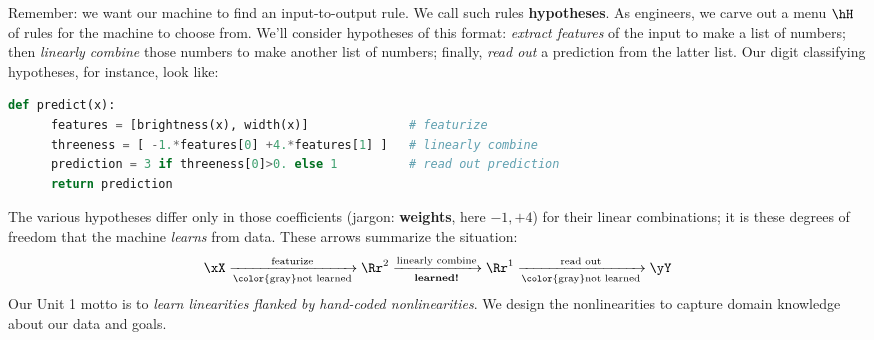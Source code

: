 

  Remember: we want our machine to find an input-to-output rule.  We call
  such rules \textbf{hypotheses}.  As engineers, we carve out a menu $\hH$ of
  rules for the machine to choose from.
  We'll consider
  hypotheses of this format:
  \emph{extract features} of the input to make a list of numbers; then
  \emph{linearly combine} those numbers to make another list of numbers;
  finally,
  \emph{read out} a prediction %
  from the latter list.
  Our digit classifying hypotheses, for instance, look like:
  \begin{lstlisting}[language=Python, basicstyle=\footnotesize\ttfamily]
    def predict(x):
      features = [brightness(x), width(x)]              # featurize
      threeness = [ -1.*features[0] +4.*features[1] ]   # linearly combine
      prediction = 3 if threeness[0]>0. else 1          # read out prediction
      return prediction
  \end{lstlisting}
  The various hypotheses differ only in those coefficients (jargon:
  \textbf{weights}, here $-1, +4$) for their linear combinations; it is these
  degrees of freedom that the machine \emph{learns} from data.
  These arrows summarize the situation:
  \[
    \xX   \xrightarrow[\text{\color{gray}not learned}]{\text{featurize}}
    \Rr^2 \xrightarrow[\text{\textbf{learned!}}]{\text{linearly combine}}
    \Rr^1 \xrightarrow[\text{\color{gray}not learned}]{\text{read out}}
    \yY
  \]
  Our Unit 1 motto is to \emph{learn linearities flanked by hand-coded
  nonlinearities}.  We design the nonlinearities to capture domain knowledge
  about our data and goals.

